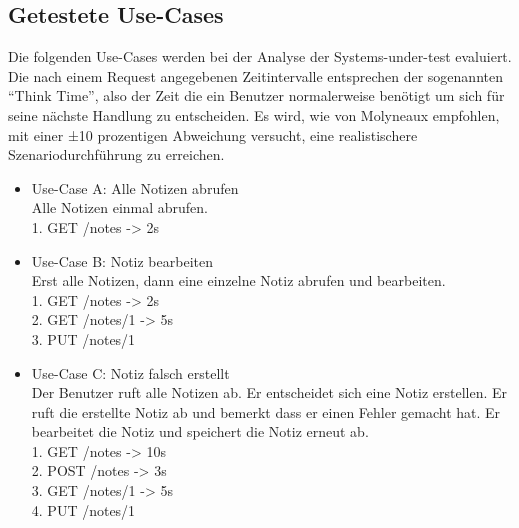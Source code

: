 \subsection{Getestete Use-Cases}\label{sec:use-cases}
Die folgenden Use-Cases werden bei der Analyse der Systems-under-test evaluiert. Die nach einem Request angegebenen Zeitintervalle entsprechen der sogenannten "`Think Time"', also der Zeit die ein Benutzer normalerweise benötigt um sich für seine nächste Handlung zu entscheiden. Es wird, wie von Molyneaux empfohlen, mit einer ±10 prozentigen Abweichung versucht, eine realistischere Szenariodurchführung zu erreichen\cite{molyneaux_art_2014}.
\begin{itemize}
    \item Use-Case A: Alle Notizen abrufen \\
        Alle Notizen einmal abrufen. \\
        1. GET /notes -> 2s     \\

    \item Use-Case B: Notiz bearbeiten \\
        Erst alle Notizen, dann eine einzelne Notiz abrufen und bearbeiten. \\
        1. GET /notes -> 2s     \\
        2. GET /notes/1 -> 5s   \\
        3. PUT /notes/1         \\
        
    \item Use-Case C: Notiz falsch erstellt \\
    Der Benutzer ruft alle Notizen ab. Er entscheidet sich eine Notiz erstellen. Er ruft die erstellte Notiz ab und bemerkt dass er einen Fehler gemacht hat. Er bearbeitet die Notiz und speichert die Notiz erneut ab. \\
        1. GET /notes   -> 10s  \\
        2. POST /notes  -> 3s   \\
        3. GET /notes/1 -> 5s   \\
        4. PUT /notes/1
\end{itemize}


